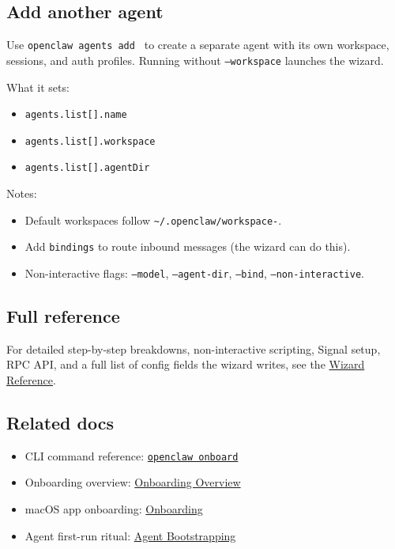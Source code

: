 \subsection{Add another agent}


Use \texttt{openclaw agents add } to create a separate agent with its own workspace,
sessions, and auth profiles. Running without \texttt{--workspace} launches the wizard.

What it sets:

\begin{itemize}
  \item \texttt{agents.list[].name}
  \item \texttt{agents.list[].workspace}
  \item \texttt{agents.list[].agentDir}
\end{itemize}


Notes:

\begin{itemize}
  \item Default workspaces follow \texttt{\textasciitilde{}/.openclaw/workspace-}.
  \item Add \texttt{bindings} to route inbound messages (the wizard can do this).
  \item Non-interactive flags: \texttt{--model}, \texttt{--agent-dir}, \texttt{--bind}, \texttt{--non-interactive}.
\end{itemize}


\subsection{Full reference}


For detailed step-by-step breakdowns, non-interactive scripting, Signal setup,
RPC API, and a full list of config fields the wizard writes, see the
\href{/reference/wizard}{Wizard Reference}.

\subsection{Related docs}


\begin{itemize}
  \item CLI command reference: \href{/cli/onboard}{\texttt{openclaw onboard}}
  \item Onboarding overview: \href{/start/onboarding-overview}{Onboarding Overview}
  \item macOS app onboarding: \href{/start/onboarding}{Onboarding}
  \item Agent first-run ritual: \href{/start/bootstrapping}{Agent Bootstrapping}
\end{itemize}



\clearpage
